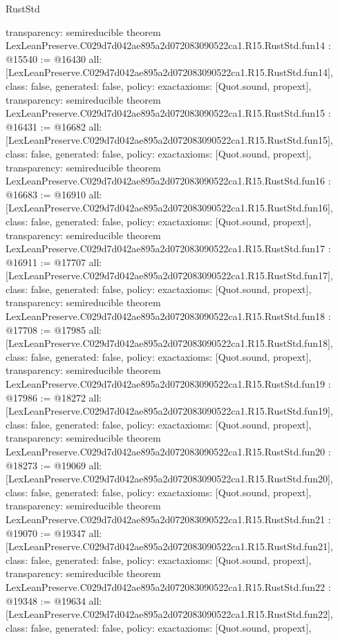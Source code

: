 \begin{lexlean}{RustStd}
\begin{coremodule}
{  transparency: semireducible
}
theorem LexLeanPreserve.C029d7d042ae895a2d072083090522ca1.R15.RustStd.fun14 : @15540 := @16430 {
  all: [LexLeanPreserve.C029d7d042ae895a2d072083090522ca1.R15.RustStd.fun14],
  class: false,
  generated: false,
  policy: exact{axioms: [Quot.sound, propext]},
  transparency: semireducible
}
theorem LexLeanPreserve.C029d7d042ae895a2d072083090522ca1.R15.RustStd.fun15 : @16431 := @16682 {
  all: [LexLeanPreserve.C029d7d042ae895a2d072083090522ca1.R15.RustStd.fun15],
  class: false,
  generated: false,
  policy: exact{axioms: [Quot.sound, propext]},
  transparency: semireducible
}
theorem LexLeanPreserve.C029d7d042ae895a2d072083090522ca1.R15.RustStd.fun16 : @16683 := @16910 {
  all: [LexLeanPreserve.C029d7d042ae895a2d072083090522ca1.R15.RustStd.fun16],
  class: false,
  generated: false,
  policy: exact{axioms: [Quot.sound, propext]},
  transparency: semireducible
}
theorem LexLeanPreserve.C029d7d042ae895a2d072083090522ca1.R15.RustStd.fun17 : @16911 := @17707 {
  all: [LexLeanPreserve.C029d7d042ae895a2d072083090522ca1.R15.RustStd.fun17],
  class: false,
  generated: false,
  policy: exact{axioms: [Quot.sound, propext]},
  transparency: semireducible
}
theorem LexLeanPreserve.C029d7d042ae895a2d072083090522ca1.R15.RustStd.fun18 : @17708 := @17985 {
  all: [LexLeanPreserve.C029d7d042ae895a2d072083090522ca1.R15.RustStd.fun18],
  class: false,
  generated: false,
  policy: exact{axioms: [Quot.sound, propext]},
  transparency: semireducible
}
theorem LexLeanPreserve.C029d7d042ae895a2d072083090522ca1.R15.RustStd.fun19 : @17986 := @18272 {
  all: [LexLeanPreserve.C029d7d042ae895a2d072083090522ca1.R15.RustStd.fun19],
  class: false,
  generated: false,
  policy: exact{axioms: [Quot.sound, propext]},
  transparency: semireducible
}
theorem LexLeanPreserve.C029d7d042ae895a2d072083090522ca1.R15.RustStd.fun20 : @18273 := @19069 {
  all: [LexLeanPreserve.C029d7d042ae895a2d072083090522ca1.R15.RustStd.fun20],
  class: false,
  generated: false,
  policy: exact{axioms: [Quot.sound, propext]},
  transparency: semireducible
}
theorem LexLeanPreserve.C029d7d042ae895a2d072083090522ca1.R15.RustStd.fun21 : @19070 := @19347 {
  all: [LexLeanPreserve.C029d7d042ae895a2d072083090522ca1.R15.RustStd.fun21],
  class: false,
  generated: false,
  policy: exact{axioms: [Quot.sound, propext]},
  transparency: semireducible
}
theorem LexLeanPreserve.C029d7d042ae895a2d072083090522ca1.R15.RustStd.fun22 : @19348 := @19634 {
  all: [LexLeanPreserve.C029d7d042ae895a2d072083090522ca1.R15.RustStd.fun22],
  class: false,
  generated: false,
  policy: exact{axioms: [Quot.sound, propext]},
}
\end{coremodule}
\end{lexlean}
